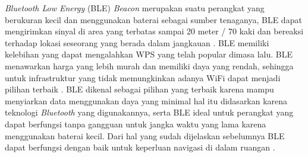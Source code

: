 \par \textit{Bluetooth Low Energy} (BLE) \textit{Beacon} merupakan suatu perangkat yang berukuran kecil dan menggunakan baterai sebagai sumber tenaganya, BLE dapat mengirimkan sinyal di area yang terbatas sampai 20 meter / 70 kaki dan bereaksi terhadap lokasi seseorang yang berada dalam jangkauan \citep{atlas2016}. BLE memiliki kelebihan yang dapat mengalahkan WPS yang telah popular dimasa lalu. BLE menawarkan harga yang lebih murah dan memiliki daya yang rendah, sehingga untuk infrastruktur yang tidak memungkinkan adanya WiFi dapat menjadi pilihan terbaik \citep{canton2017}. BLE dikenal sebagai pilihan yang terbaik karena mampu menyiarkan data menggunakan daya yang minimal hal itu didasarkan karena teknologi \textit{Bluetooth} yang digunakannya, serta BLE ideal untuk perangkat yang dapat berfungsi tanpa gangguan untuk jangka waktu yang lama karena menggunakan baterai kecil. Dari hal yang sudah dijelaskan sebelumnya BLE dapat berfungsi dengan baik untuk keperluan navigasi di dalam ruangan \citep{herrera2016}. 

